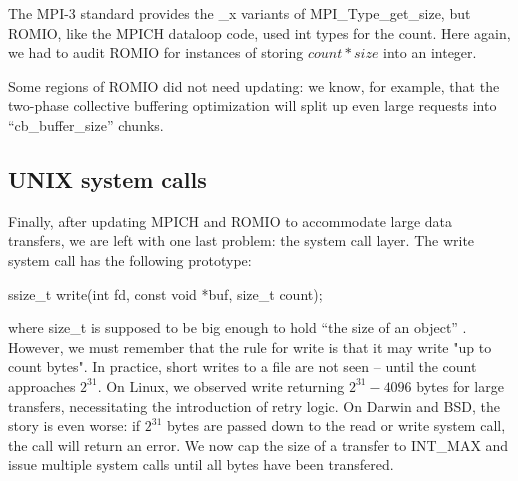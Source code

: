 The MPI-3 standard provides the \_x variants of MPI\_Type\_get\_size, but
ROMIO, like the MPICH dataloop code, used int types for the count.
Here again,  we had to audit ROMIO for instances of storing $count * size$
into an integer.

Some regions of ROMIO did not need updating: we know, for example, that the
two-phase collective buffering optimization will split up even large requests
into ``cb\_buffer\_size'' chunks.

\subsection{UNIX system calls}

Finally, after updating MPICH and ROMIO to accommodate large data transfers,
we are left with one last problem: the system call layer.
The write system call has the following prototype:

\begin{code}
ssize_t write(int fd, const void *buf, size_t count);
\end{code}

where size\_t is supposed to be big enough to hold ``the size of an object''
\cite{posix-std}.  However, we must remember that the rule for write is that it may
write "up to count bytes".  In practice, short writes to a file are not seen --
until the count approaches $2^{31}$.  On Linux, we observed write returning
$2^{31}-4096$ bytes for large transfers, necessitating the introduction of retry
logic.  On Darwin and BSD, the story is even worse: if $2^{31}$ bytes are passed
down to the read or write system call, the call will return an error.  We now
cap the size of a transfer to INT\_MAX and issue multiple system calls until
all bytes have been transfered.
